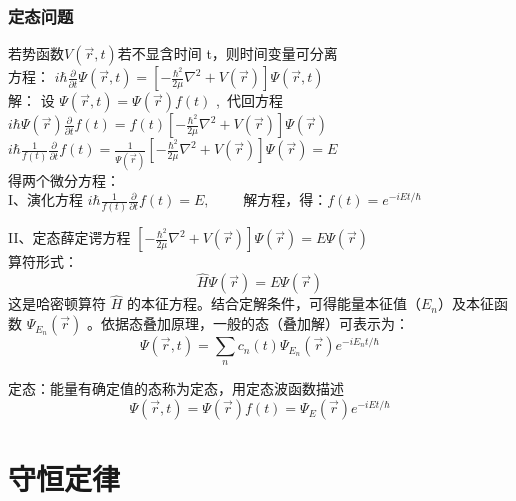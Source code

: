 \begin{frame} 
    \frametitle{定态问题}
    若势函数$V(\vec{r},t ) $若不显含时间 t，则时间变量可分离 \\ \vspace{0.3cm}
    方程： { $ \displaystyle i \hbar \frac{\partial }{\partial t} \Psi (\vec{r},t ) =\left [- \frac{\hbar^2}{2\mu }\nabla ^2 + V(\vec{r}) \right ]\Psi (\vec{r},t ) $}  \\  \vspace{0.3cm}
    \alert{解：}  设  $\Psi (\vec{r},t )  = \Psi (\vec{r} ) f(t) $ , 代回方程 \\ 
     { $ \displaystyle i\hbar \Psi (\vec{r})  \frac{\partial }{\partial t} f(t)=f(t) \left [ -\frac{\hbar^2}{2\mu }\nabla ^2 + V(\vec{r}) \right ]\Psi (\vec{r}) $}  \\ 	
     { $ \displaystyle i\hbar \frac{1}{f(t)}  \frac{\partial }{\partial t} f(t)= \frac{1}{\Psi (\vec{r}) } \left [ -\frac{\hbar^2}{2\mu }\nabla ^2 + V(\vec{r}) \right ]\Psi (\vec{r}) =E $}  \\ \vspace{0.3cm} 
     得两个微分方程：\\  \vspace{0.3cm}
     I、演化方程  $ \displaystyle  i\hbar \frac{1}{f(t)}  \frac{\partial }{\partial t} f(t)=E, \qquad $  
        解方程，得：$\displaystyle  f(t) =e^{-iEt/\hbar}$ 
\end{frame}

\begin{frame} 
    II、定态薛定谔方程 $\displaystyle   \left [ -\frac{\hbar^2}{2\mu }\nabla ^2 + V(\vec{r}) \right ]\Psi (\vec{r}) =E \Psi (\vec{r})  $   \\ 
    算符形式：$$\displaystyle   \hat{H} \Psi (\vec{r}) =E \Psi (\vec{r})  $$   
    这是哈密顿算符 $\hat{H}$ 的本征方程。结合定解条件，可得能量本征值（$E_n$）及本征函数 $\Psi_{E_n} (\vec{r} )$ 。依据态叠加原理，一般的态（叠加解）可表示为：
    \[ \Psi (\vec{r},t ) =\sum\limits_n c_n(t)\Psi_{E_n} (\vec{r} ) e^{-iE_n t/\hbar}  \]
    \begin{definition}
        定态：能量有确定值的态称为定态，用定态波函数描述
        \[ \Psi (\vec{r},t )  = \Psi (\vec{r} ) f(t) = \Psi_E (\vec{r} ) e^{-iEt/\hbar} \] 
    \end{definition}
\end{frame}

\section{守恒定律}

